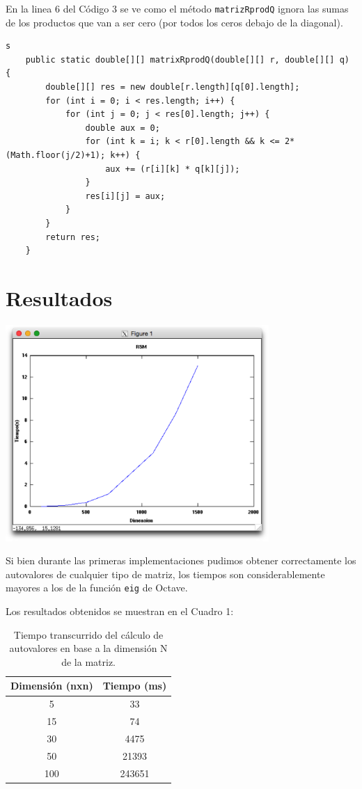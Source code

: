 \documentclass[a4paper,10pt,spanish]{article}
\begin{document}
En la linea 6 del Código 3 se ve como el método \texttt{matrizRprodQ}  ignora las sumas de los productos que van a ser cero (por todos los ceros debajo de la diagonal).

\begin{lstlisting}[caption = Optimización del producto entre R y Q]s
	public static double[][] matrixRprodQ(double[][] r, double[][] q) {
		double[][] res = new double[r.length][q[0].length];
		for (int i = 0; i < res.length; i++) {
			for (int j = 0; j < res[0].length; j++) {
				double aux = 0;
				for (int k = i; k < r[0].length && k <= 2*(Math.floor(j/2)+1); k++) {
					aux += (r[i][k] * q[k][j]);
				}
				res[i][j] = aux;
			}
		}
		return res;
	}
\end{lstlisting}

\pagebreak

\section{Resultados}

\includegraphics[width=100mm]{GenerateRSM.png} 

Si bien durante las primeras implementaciones pudimos obtener correctamente los autovalores de cualquier tipo de matriz, los tiempos son considerablemente mayores a los de la función \texttt{eig} de Octave.

Los resultados obtenidos se muestran en el Cuadro 1:

\begin{center}
\begin{table}[h]
\centering
\begin{tabular}{cc}
\hline
\textbf{Dimensión (nxn)} & \textbf{Tiempo (ms)} \\ \hline
5                  & 33                 \\
15                 & 74                 \\
30                 & 4475                 \\
50                 & 21393                \\
100                & 243651
\end{tabular}
\caption[Texto del índice (opcional)]{Tiempo transcurrido del cálculo de autovalores en base a la dimensión N de la matriz.}
\end{table}
\end{center}
\end{document}
